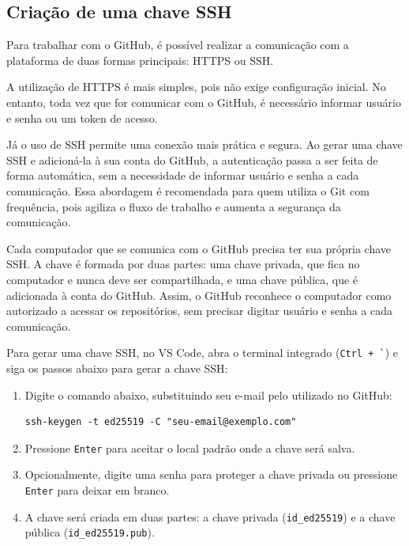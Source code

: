 \begin{enumerate}
\end{enumerate}

\subsection{Criação de uma chave SSH}

Para trabalhar com o GitHub, é possível realizar a comunicação com a plataforma de duas formas principais: HTTPS ou SSH.

A utilização de HTTPS é mais simples, pois não exige configuração inicial. No entanto, toda vez que for comunicar com o GitHub, é necessário informar usuário e senha ou um token de acesso.

Já o uso de SSH permite uma conexão mais prática e segura. Ao gerar uma chave SSH e adicioná-la à sua conta do GitHub, a autenticação passa a ser feita de forma automática, sem a necessidade de informar usuário e senha a cada comunicação. Essa abordagem é recomendada para quem utiliza o Git com frequência, pois agiliza o fluxo de trabalho e aumenta a segurança da comunicação.

Cada computador que se comunica com o GitHub precisa ter sua própria chave SSH. A chave é formada por duas partes: uma chave privada, que fica no computador e nunca deve ser compartilhada, e uma chave pública, que é adicionada à conta do GitHub. Assim, o GitHub reconhece o computador como autorizado a acessar os repositórios, sem precisar digitar usuário e senha a cada comunicação.

Para gerar uma chave SSH, no VS Code, abra o terminal integrado (\texttt{Ctrl + \`}) e siga os passos abaixo para gerar a chave SSH:

\begin{enumerate}
    \item Digite o comando abaixo, substituindo seu e-mail pelo utilizado no GitHub:
    \begin{lstlisting}[style=shellstyle]
ssh-keygen -t ed25519 -C "seu-email@exemplo.com"
    \end{lstlisting}
    \item Pressione \texttt{Enter} para aceitar o local padrão onde a chave será salva.
    \item Opcionalmente, digite uma senha para proteger a chave privada ou pressione \texttt{Enter} para deixar em branco.
    \item A chave será criada em duas partes: a chave privada (\texttt{id\_ed25519}) e a chave pública (\texttt{id\_ed25519.pub}).
\end{enumerate}


